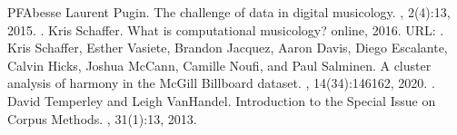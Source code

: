 \documentclass[letterpaper,10pt,english]{sphinxmanual}
\begin{document}
\begin{sphinxthebibliography}{PFAbesse}
Laurent Pugin. The challenge of data in digital musicology. , 2(4):1\textendash{}3, 2015. .
Kris Schaffer. What is computational musicology? online, 2016. URL: .
Kris Schaffer, Esther Vasiete, Brandon Jacquez, Aaron Davis, Diego Escalante, Calvin Hicks, Joshua McCann, Camille Noufi, and Paul Salminen. A cluster analysis of harmony in the McGill Billboard dataset. , 14(3\textendash{}4):146\textendash{}162, 2020. .
David Temperley and Leigh VanHandel. Introduction to the Special Issue on Corpus Methods. , 31(1):1\textendash{}3, 2013.
\end{sphinxthebibliography}



\renewcommand{\indexname}{Index}
\printindex
\end{document}
